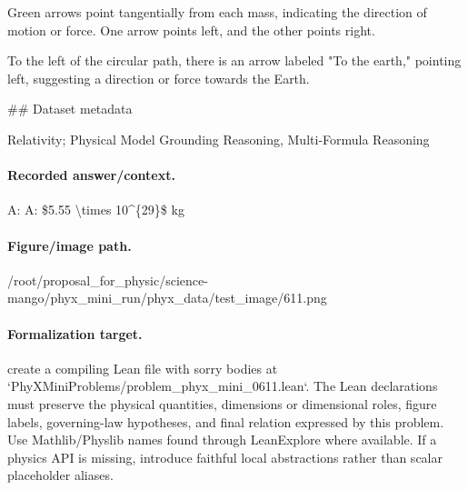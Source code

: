 Green arrows point tangentially from each mass, indicating the direction of motion or force. One arrow points left, and the other points right.

To the left of the circular path, there is an arrow labeled "To the earth," pointing left, suggesting a direction or force towards the Earth.

\#\# Dataset metadata

Relativity; Physical Model Grounding Reasoning, Multi-Formula Reasoning

\paragraph{Recorded answer/context.}
A: A: \$5.55 \textbackslash{}times 10\textasciicircum{}\{29\}\$ kg

\paragraph{Figure/image path.}
/root/proposal\_for\_physic/science-mango/phyx\_mini\_run/phyx\_data/test\_image/611.png

\paragraph{Formalization target.}
create a compiling Lean file with sorry bodies at `PhyXMiniProblems/problem\_phyx\_mini\_0611.lean`. The Lean declarations must preserve the physical quantities, dimensions or dimensional roles, figure labels, governing-law hypotheses, and final relation expressed by this problem.
Use Mathlib/Physlib names found through LeanExplore where available. If a physics API is missing, introduce faithful local abstractions rather than scalar placeholder aliases.

